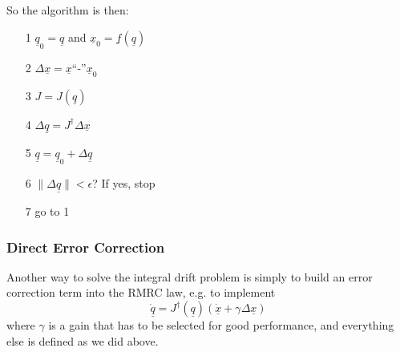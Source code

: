 \documentclass[]{article}
\begin{document}
So the algorithm is then:
\begin{itemize}
	\item[1] $\underline{q}_{0}=\underline{q}$ and $\underline{x}_{0} = \underline{f}(\underline{q})$
	\item[2] $\Delta\underline{x} = \underline{x}$``-''$\underline{x}_{0}$
	\item[3] $J=J(\underline{q})$
	\item[4] $\Delta \underline{q} = J^{\dag}\Delta \underline{x}$
	\item[5] $\underline{q} = \underline{q}_{0} + \Delta \underline{q}$
	\item[6] $\|\Delta \underline{q}\| < \epsilon$? If yes, stop
	\item[7] go to 1
\end{itemize}

\subsubsection{Direct Error Correction}
Another way to solve the integral drift problem is simply to build an error correction term into the RMRC law, e.g. to implement
\begin{displaymath}
\dot{\underline{q}} = J^{\dag}(\underline{q})\left(\dot{\underline{x}} + \gamma \Delta \underline{x}\right)
\end{displaymath}
where $\gamma$ is a gain that has to be selected for good performance, and everything else is defined as we did above.
\end{document}
